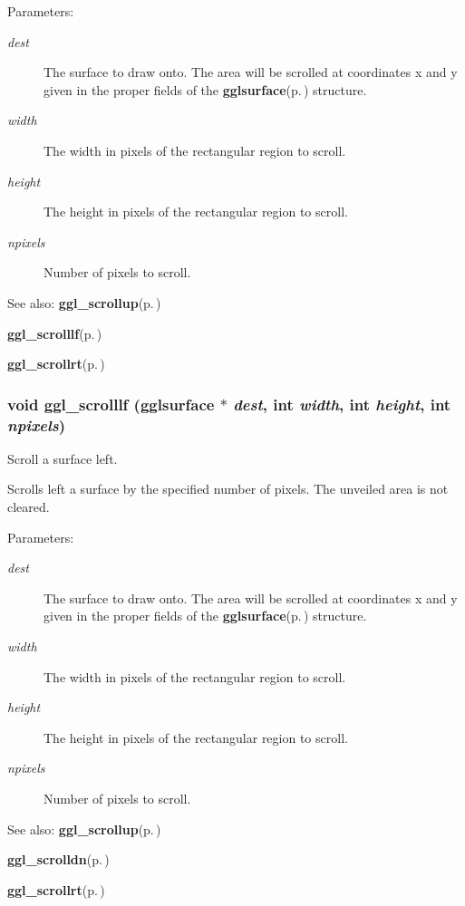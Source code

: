 \begin{Desc}
\item[Parameters:]
\begin{description}
\item[{\em dest}]The surface to draw onto. The area will be scrolled at coordinates x and y given in the proper fields of the {\bf gglsurface}{\rm (p.\,\pageref{structgglsurface})} structure. \item[{\em width}]The width in pixels of the rectangular region to scroll. \item[{\em height}]The height in pixels of the rectangular region to scroll. \item[{\em npixels}]Number of pixels to scroll.\end{description}
\end{Desc}
\begin{Desc}
\item[See also:]{\bf ggl\_\-scrollup}{\rm (p.\,\pageref{ggl_8h_a22})} 

{\bf ggl\_\-scrolllf}{\rm (p.\,\pageref{ggl_8h_a24})} 

{\bf ggl\_\-scrollrt}{\rm (p.\,\pageref{ggl_8h_a25})} \end{Desc}
\subsubsection{\setlength{\rightskip}{0pt plus 5cm}void ggl\_\-scrolllf ({\bf gglsurface} $\ast$ {\em dest}, int {\em width}, int {\em height}, int {\em npixels})}\label{ggl_8h_a24}


Scroll a surface left. 

Scrolls left a surface by the specified number of pixels. The unveiled area is not cleared.

\begin{Desc}
\item[Parameters:]
\begin{description}
\item[{\em dest}]The surface to draw onto. The area will be scrolled at coordinates x and y given in the proper fields of the {\bf gglsurface}{\rm (p.\,\pageref{structgglsurface})} structure. \item[{\em width}]The width in pixels of the rectangular region to scroll. \item[{\em height}]The height in pixels of the rectangular region to scroll. \item[{\em npixels}]Number of pixels to scroll.\end{description}
\end{Desc}
\begin{Desc}
\item[See also:]{\bf ggl\_\-scrollup}{\rm (p.\,\pageref{ggl_8h_a22})} 

{\bf ggl\_\-scrolldn}{\rm (p.\,\pageref{ggl_8h_a23})} 

{\bf ggl\_\-scrollrt}{\rm (p.\,\pageref{ggl_8h_a25})} \end{Desc}

